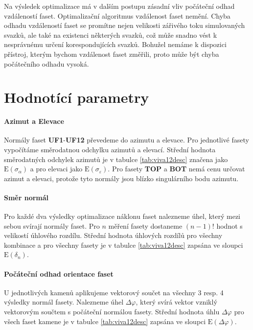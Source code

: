 	Na výsledek optimalizace má v dalším postupu zásadní vliv počáteční odhad vzdáleností faset. Optimalizační algoritmus vzdálenost faset nemění. Chyba odhadu vzdáleností faset se promítne nejen velikosti zářivého toku simulovaných svazků, ale také na existenci některých svazků, což může snadno vést k nesprávnému určení korespondujících svazků. Bohužel nemáme k dispozici přístroj, kterým bychom vzdálenost faset změřili, proto může být chyba počátečního odhadu vysoká. 
	
\newpage
\section{Hodnotící parametry}

\paragraph{Azimut a Elevace}
\hspace{1mm}
	
		Normály faset \textbf{UF1}-\textbf{UF12} převedeme do azimutu a elevace. Pro jednotlivé fasety vypočítáme směrodatnou odchylku azimutů a elevací. Střední hodnota směrodatných odchylek azimutů je v tabulce \ref{tab:viva12desc} značena jako $\mathrm{E}(\sigma_{\alpha})$ a pro elevaci jako $\mathrm{E}(\sigma_{\varepsilon})$. Pro fasety \textbf{TOP} a \textbf{BOT} nemá cenu určovat azimut a elevaci, protože tyto normály jsou blízko singulárního bodu azimutu. 

\paragraph{Směr normál}
\hspace{1mm}	
	
	Pro každé dva výsledky optimalizace náklonu faset nalezneme úhel, který mezi sebou svírají normály faset. Pro $n$ měření fasety dostaneme $(n-1)!$ hodnot s velikostí úhlového rozdílu. Střední hodnota úhlových rozdílů pro všechny kombinace a pro všechny fasety je v tabulce \ref{tab:viva12desc} zapsána ve sloupci $\mathrm{E}(\delta_n)$. 
	
\paragraph{Počáteční odhad orientace faset}
\hspace{1mm}	
	U jednotlivých kamenů aplikujeme vektorový součet na všechny 3 resp. 4 výsledky normál fasety. Nalezneme úhel $\Delta\varphi$, který svírá vektor vzniklý vektorovým součtem s počáteční normálou fasety. Střední hodnota úhlu $\Delta\varphi$ pro všech faset kamene je v tabulce \ref{tab:viva12desc} zapsána ve sloupci $\mathrm{E}(\Delta\varphi)$.

